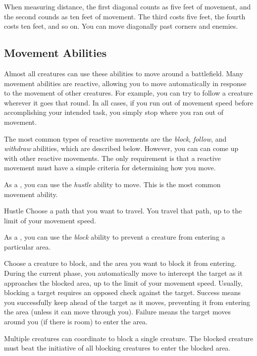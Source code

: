         \label{Diagonals} When measuring distance, the first diagonal counts as five feet of movement, and the second counds as ten feet of movement.
        The third costs five feet, the fourth costs ten feet, and so on.
        You can move diagonally past corners and enemies.

    \subsection{Movement Abilities}\label{Movement Abilities}

        Almost all creatures can use these abilities to move around a battlefield.
        Many movement abilities are reactive, allowing you to move automatically in response to the movement of other creatures.
        For example, you can try to follow a creature wherever it goes that round.
        In all cases, if you run out of movement speed before accomplishing your intended task, you simply stop where you ran out of movement.

        The most common types of reactive movements are the \textit{block}, \textit{follow}, and \textit{withdraw} abilities, which are described below.
        However, you can can come up with other reactive movements.
        The only requirement is that a reactive movement must have a simple criteria for determining how you move.

         As a , you can use the \textit{hustle} ability to move.
        This is the most common movement ability.

        \begin{freeability}{Hustle}
            Choose a path that you want to travel.  You travel that path, up to the limit of your movement speed.
        \end{freeability}

         As a , you can use the \textit{block} ability to prevent a creature from entering a particular area.

        \begin{freeability}{}
            Choose a creature to block, and the area you want to block it from entering.
            During the current phase, you automatically move to intercept the target as it approaches the blocked area, up to the limit of your movement speed.
            Usually, blocking a target requires an opposed  check against the target.
            Success means you successfully keep ahead of the target as it moves, preventing it from entering the area (unless it can move through you).
            Failure means the target moves around you (if there is room) to enter the area.

            Multiple creatures can coordinate to block a single creature.
            The blocked creature must beat the initiative of all blocking creatures to enter the blocked area.
        \end{freeability}

